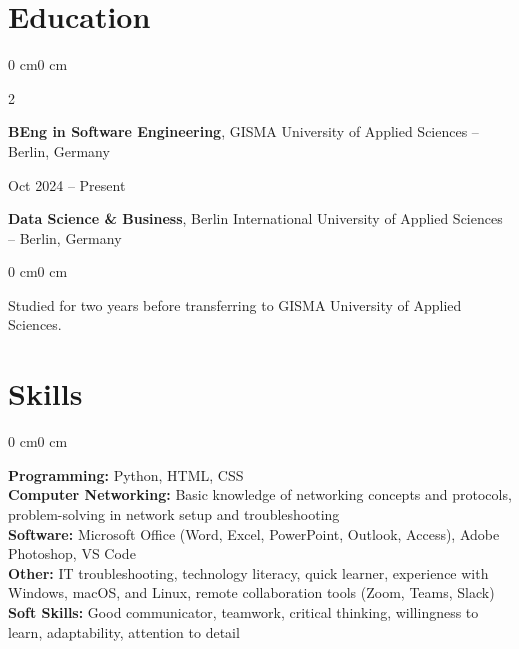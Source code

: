 \documentclass[10pt, letterpaper]{article}
\newenvironment{onecolentry}{
    \begin{adjustwidth}{0 cm}{0 cm}
}{
    \end{adjustwidth}
}
\newenvironment{twocolentry}[2][]{
    \onecolentry
    \def\secondColumn{#2}
    \setcolumnwidth{\fill, 100cm}
    \begin{paracol}{2}
}{
    \switchcolumn \raggedleft \secondColumn
    \end{paracol}
    \endonecolentry
}
\begin{document}
    \section{Education}
    \begin{twocolentry}{
        Oct 2024 -- Present
    }
        \textbf{BEng in Software Engineering}, GISMA University of Applied Sciences -- Berlin, Germany
    \end{twocolentry}

    \vspace{0.10 cm}
        \textbf{Data Science \& Business}, Berlin International University of Applied Sciences -- Berlin, Germany

    \vspace{0.10 cm}
    \begin{onecolentry}
        Studied for two years before transferring to GISMA University of Applied Sciences.
    \end{onecolentry}

    \section{Skills}
    \begin{onecolentry}
        \textbf{Programming:} Python, HTML, CSS \\
        \textbf{Computer Networking:} Basic knowledge of networking concepts and protocols, problem-solving in network setup and troubleshooting \\
        \textbf{Software:} Microsoft Office (Word, Excel, PowerPoint, Outlook, Access), Adobe Photoshop, VS Code \\
        \textbf{Other:} IT troubleshooting, technology literacy, quick learner, experience with Windows, macOS, and Linux, remote collaboration tools (Zoom, Teams, Slack) \\
        \textbf{Soft Skills:} Good communicator, teamwork, critical thinking, willingness to learn, adaptability, attention to detail
    \end{onecolentry}

\end{document}
